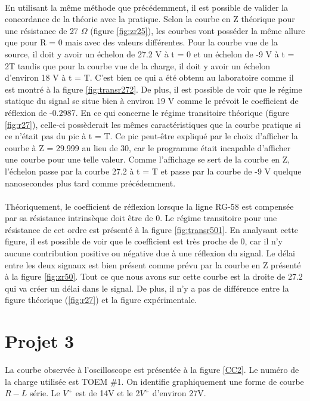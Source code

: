 \paragraph{} En utilisant la même méthode que précédemment, il est possible de valider la concordance de la théorie avec la pratique. Selon la courbe en Z théorique pour une résistance de 27 $\Omega$ (figure \ref{fig:zr25}), les courbes vont posséder la même allure que pour R = 0 mais avec des valeurs différentes. Pour la courbe vue de la source, il doit y avoir un échelon de 27.2 V à t = 0 et un échelon de -9 V à t = 2T tandis que pour la courbe vue de la charge, il doit y avoir un échelon d'environ 18 V à t = T. C'est bien ce qui a été obtenu au laboratoire comme il est montré à la figure \ref{fig:transr272}. De plus, il est possible de voir que le régime statique du signal se situe bien à environ 19 V comme le prévoit le coefficient de réflexion de -0.2987. En ce qui concerne le régime transitoire théorique (figure \ref{fig:r27}), celle-ci possèderait les mêmes caractéristiques que la courbe pratique si ce n'était pas du pic à t = T. Ce pic peut-être expliqué par le choix d'afficher la courbe à Z = 29.999 au lieu de 30, car le programme était incapable d'afficher une courbe pour une telle valeur. Comme l'affichage se sert de la courbe en Z, l'échelon passe par la courbe 27.2 à t = T et passe par la courbe de -9 V quelque nanosecondes plus tard comme précédemment.

\paragraph{} Théoriquement, le coefficient de réflexion lorsque la ligne RG-58 est compensée par sa résistance intrinsèque doit être de 0. Le régime transitoire pour une résistance de cet ordre est présenté à la figure \ref{fig:transr501}. En analysant cette figure, il est possible de voir que le coefficient est très proche de 0, car il n'y aucune contribution positive ou négative due à une réflexion du signal. Le délai entre les deux signaux est bien présent comme prévu par la courbe en Z présenté à la figure \ref{fig:zr50}. Tout ce que nous avons sur cette courbe est la droite de 27.2 qui va créer un délai dans le signal. De plus, il n'y a pas de différence entre la figure théorique (\ref{fig:r27}) et la figure expérimentale.

\clearpage
\newpage
\section{Projet 3}
La courbe observée à l'oscilloscope est présentée à la figure \ref{CC2}. Le numéro de la charge utilisée est TOEM \#1. On identifie graphiquement une forme de courbe $R-L$ série.  Le $V^{+}$  est de 14V et le 2$V^{+}$ d'environ 27V.

